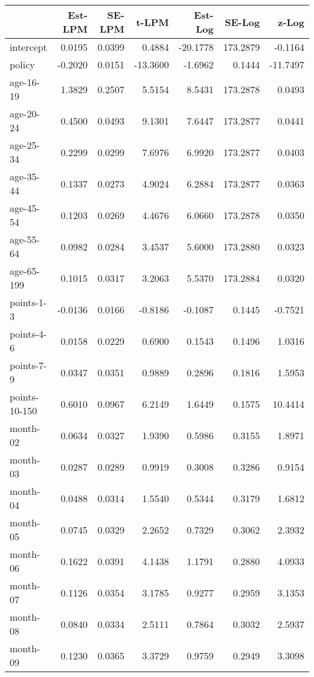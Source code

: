 \documentclass[10pt]{article}
\begin{document}
\begin{table}[ht]
\centering
\begin{tabular}{lrrrrrr}
  \hline
 & Est-LPM & SE-LPM & t-LPM & Est-Log & SE-Log & z-Log \\ 
  \hline
intercept & 0.0195 & 0.0399 & 0.4884 & -20.1778 & 173.2879 & -0.1164 \\ 
  policy & -0.2020 & 0.0151 & -13.3600 & -1.6962 & 0.1444 & -11.7497 \\ 
  age-16-19 & 1.3829 & 0.2507 & 5.5154 & 8.5431 & 173.2878 & 0.0493 \\ 
  age-20-24 & 0.4500 & 0.0493 & 9.1301 & 7.6447 & 173.2877 & 0.0441 \\ 
  age-25-34 & 0.2299 & 0.0299 & 7.6976 & 6.9920 & 173.2877 & 0.0403 \\ 
  age-35-44 & 0.1337 & 0.0273 & 4.9024 & 6.2884 & 173.2877 & 0.0363 \\ 
  age-45-54 & 0.1203 & 0.0269 & 4.4676 & 6.0660 & 173.2878 & 0.0350 \\ 
  age-55-64 & 0.0982 & 0.0284 & 3.4537 & 5.6000 & 173.2880 & 0.0323 \\ 
  age-65-199 & 0.1015 & 0.0317 & 3.2063 & 5.5370 & 173.2884 & 0.0320 \\ 
  points-1-3 & -0.0136 & 0.0166 & -0.8186 & -0.1087 & 0.1445 & -0.7521 \\ 
  points-4-6 & 0.0158 & 0.0229 & 0.6900 & 0.1543 & 0.1496 & 1.0316 \\ 
  points-7-9 & 0.0347 & 0.0351 & 0.9889 & 0.2896 & 0.1816 & 1.5953 \\ 
  points-10-150 & 0.6010 & 0.0967 & 6.2149 & 1.6449 & 0.1575 & 10.4414 \\ 
  month-02 & 0.0634 & 0.0327 & 1.9390 & 0.5986 & 0.3155 & 1.8971 \\ 
  month-03 & 0.0287 & 0.0289 & 0.9919 & 0.3008 & 0.3286 & 0.9154 \\ 
  month-04 & 0.0488 & 0.0314 & 1.5540 & 0.5344 & 0.3179 & 1.6812 \\ 
  month-05 & 0.0745 & 0.0329 & 2.2652 & 0.7329 & 0.3062 & 2.3932 \\ 
  month-06 & 0.1622 & 0.0391 & 4.1438 & 1.1791 & 0.2880 & 4.0933 \\ 
  month-07 & 0.1126 & 0.0354 & 3.1785 & 0.9277 & 0.2959 & 3.1353 \\ 
  month-08 & 0.0840 & 0.0334 & 2.5111 & 0.7864 & 0.3032 & 2.5937 \\ 
  month-09 & 0.1230 & 0.0365 & 3.3729 & 0.9759 & 0.2949 & 3.3098 \\ 

\end{tabular}
\end{table}
\end{document}
